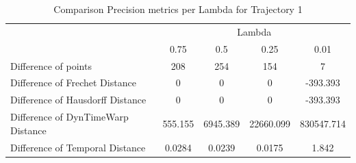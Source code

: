 \begin{table}[htbp]
\centering
\label{tab:precision_metrics_c}
\begin{tabular}{@{}lcccc@{}}
\toprule
& \multicolumn{4}{c}{Lambda} \\
\cmidrule{2-5}
& 0.75       & 0.5        & 0.25       & 0.01       \\
\midrule
Difference of points           & 208 & 254 & 154 & 7 \\
Difference of Frechet Distance              & 0 & 0 & 0 & -393.393 \\
Difference of Hausdorff Distance             & 0 & 0 & 0 & -393.393 \\
Difference of DynTimeWarp Distance            & 555.155 & 6945.389 & 22660.099 & 830547.714\\
Difference of Temporal Distance            & 0.0284 & 0.0239 & 0.0175 & 1.842\\
\bottomrule
\end{tabular}
\caption{Comparison Precision metrics per Lambda for Trajectory 1 }
\end{table}


